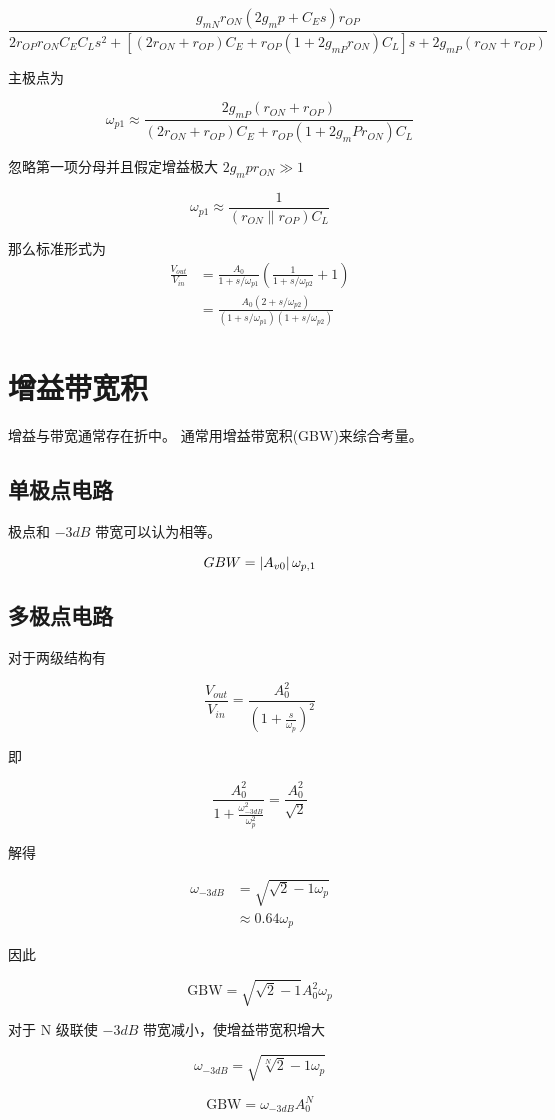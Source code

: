 \documentclass[cn,11pt,chinese,black,simple]{../elegantbook}
\begin{document}
\[\frac{g_{m N} r_{O N}\left(2 g_{m} p+C_{E} s\right) r_{O P}}{2 r_{O P} r_{O N} C_{E} C_{L} s^{2}+\left[\left(2 r_{O N}+r_{O P}\right) C_{E}+r_{O P}\left(1+2 g_{m P} r_{O N}\right) C_{L}\right] s+2 g_{m P}\left(r_{O N}+r_{O P}\right)}\]

主极点为 

\[\omega_{p 1} \approx \frac{2 g_{m P}\left(r_{O N}+r_{O P}\right)}{\left(2 r_{O N}+r_{O P}\right) C_{E}+r_{O P}\left(1+2 g_{m} P r_{O N}\right) C_{L}}\]

忽略第一项分母并且假定增益极大 \(2 g_{m} p r_{O N} \gg 1\)

\[\omega_{p 1} \approx \frac{1}{\left(r_{O N} \| r_{O P}\right) C_{L}}\]

那么标准形式为 
\[\begin{aligned}
    \frac{V_{o u t}}{V_{i n}} &=\frac{A_{0}}{1+s / \omega_{p 1}}\left(\frac{1}{1+s / \omega_{p 2}}+1\right) \\
    &=\frac{A_{0}\left(2+s / \omega_{p 2}\right)}{\left(1+s / \omega_{p 1}\right)\left(1+s / \omega_{p 2}\right)}
    \end{aligned}\]

\section{增益带宽积}

增益与带宽通常存在折中。
通常用增益带宽积(GBW)来综合考量。

\subsection{单极点电路}

极点和 \(-3 dB\) 带宽可以认为相等。

\[GBW = \left| A_{v0} \right| \omega_{p,1}\]

\subsection{多极点电路}



对于两级结构有 

\[\frac{V_{o u t}}{V_{i n}}=\frac{A_{0}^{2}}{\left(1+\frac{s}{\omega_{p}}\right)^{2}}\]

即 

\[\frac{A_{0}^{2}}{1+\frac{\omega_{-3 d B}^{2}}{\omega_{p}^{2}}}=\frac{A_{0}^{2}}{\sqrt{2}}\]

解得

\[\begin{aligned}
    \omega_{-3 d B} &=\sqrt{\sqrt{2}-1 \omega_{p}} \\
    & \approx 0.64 \omega_{p}
    \end{aligned}\]

因此

\[\mathrm{GBW}=\sqrt{\sqrt{2}-1} A_{0}^{2} \omega_{p}\]

对于 N 级联使 \(-3 dB\) 带宽减小，使增益带宽积增大

\[\omega_{-3 d B}=\sqrt{\sqrt[N]{2}-1 \omega_{p}}\]

\[\mathrm{GBW} = \omega_{-3 d B} A_0^N\]





\ifx\mainclass\undefined
\end{document}
